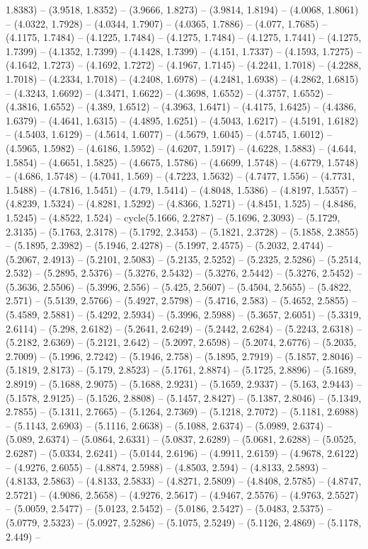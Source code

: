 1.8383) -- (3.9518, 1.8352) -- (3.9666, 1.8273) -- (3.9814, 1.8194) -- (4.0068, 1.8061) -- (4.0322, 1.7928) -- (4.0344, 1.7907) -- (4.0365, 1.7886) -- (4.077, 1.7685) -- (4.1175, 1.7484) -- (4.1225, 1.7484) -- (4.1275, 1.7484) -- (4.1275, 1.7441) -- (4.1275, 1.7399) -- (4.1352, 1.7399) -- (4.1428, 1.7399) -- (4.151, 1.7337) -- (4.1593, 1.7275) -- (4.1642, 1.7273) -- (4.1692, 1.7272) -- (4.1967, 1.7145) -- (4.2241, 1.7018) -- (4.2288, 1.7018) -- (4.2334, 1.7018) -- (4.2408, 1.6978) -- (4.2481, 1.6938) -- (4.2862, 1.6815) -- (4.3243, 1.6692) -- (4.3471, 1.6622) -- (4.3698, 1.6552) -- (4.3757, 1.6552) -- (4.3816, 1.6552) -- (4.389, 1.6512) -- (4.3963, 1.6471) -- (4.4175, 1.6425) -- (4.4386, 1.6379) -- (4.4641, 1.6315) -- (4.4895, 1.6251) -- (4.5043, 1.6217) -- (4.5191, 1.6182) -- (4.5403, 1.6129) -- (4.5614, 1.6077) -- (4.5679, 1.6045) -- (4.5745, 1.6012) -- (4.5965, 1.5982) -- (4.6186, 1.5952) -- (4.6207, 1.5917) -- (4.6228, 1.5883) -- (4.644, 1.5854) -- (4.6651, 1.5825) -- (4.6675, 1.5786) -- (4.6699, 1.5748) -- (4.6779, 1.5748) -- (4.686, 1.5748) -- (4.7041, 1.569) -- (4.7223, 1.5632) -- (4.7477, 1.556) -- (4.7731, 1.5488) -- (4.7816, 1.5451) -- (4.79, 1.5414) -- (4.8048, 1.5386) -- (4.8197, 1.5357) -- (4.8239, 1.5324) -- (4.8281, 1.5292) -- (4.8366, 1.5271) -- (4.8451, 1.525) -- (4.8486, 1.5245) -- (4.8522, 1.524) -- cycle(5.1666, 2.2787) -- (5.1696, 2.3093) -- (5.1729, 2.3135) -- (5.1763, 2.3178) -- (5.1792, 2.3453) -- (5.1821, 2.3728) -- (5.1858, 2.3855) -- (5.1895, 2.3982) -- (5.1946, 2.4278) -- (5.1997, 2.4575) -- (5.2032, 2.4744) -- (5.2067, 2.4913) -- (5.2101, 2.5083) -- (5.2135, 2.5252) -- (5.2325, 2.5286) -- (5.2514, 2.532) -- (5.2895, 2.5376) -- (5.3276, 2.5432) -- (5.3276, 2.5442) -- (5.3276, 2.5452) -- (5.3636, 2.5506) -- (5.3996, 2.556) -- (5.425, 2.5607) -- (5.4504, 2.5655) -- (5.4822, 2.571) -- (5.5139, 2.5766) -- (5.4927, 2.5798) -- (5.4716, 2.583) -- (5.4652, 2.5855) -- (5.4589, 2.5881) -- (5.4292, 2.5934) -- (5.3996, 2.5988) -- (5.3657, 2.6051) -- (5.3319, 2.6114) -- (5.298, 2.6182) -- (5.2641, 2.6249) -- (5.2442, 2.6284) -- (5.2243, 2.6318) -- (5.2182, 2.6369) -- (5.2121, 2.642) -- (5.2097, 2.6598) -- (5.2074, 2.6776) -- (5.2035, 2.7009) -- (5.1996, 2.7242) -- (5.1946, 2.758) -- (5.1895, 2.7919) -- (5.1857, 2.8046) -- (5.1819, 2.8173) -- (5.179, 2.8523) -- (5.1761, 2.8874) -- (5.1725, 2.8896) -- (5.1689, 2.8919) -- (5.1688, 2.9075) -- (5.1688, 2.9231) -- (5.1659, 2.9337) -- (5.163, 2.9443) -- (5.1578, 2.9125) -- (5.1526, 2.8808) -- (5.1457, 2.8427) -- (5.1387, 2.8046) -- (5.1349, 2.7855) -- (5.1311, 2.7665) -- (5.1264, 2.7369) -- (5.1218, 2.7072) -- (5.1181, 2.6988) -- (5.1143, 2.6903) -- (5.1116, 2.6638) -- (5.1088, 2.6374) -- (5.0989, 2.6374) -- (5.089, 2.6374) -- (5.0864, 2.6331) -- (5.0837, 2.6289) -- (5.0681, 2.6288) -- (5.0525, 2.6287) -- (5.0334, 2.6241) -- (5.0144, 2.6196) -- (4.9911, 2.6159) -- (4.9678, 2.6122) -- (4.9276, 2.6055) -- (4.8874, 2.5988) -- (4.8503, 2.594) -- (4.8133, 2.5893) -- (4.8133, 2.5863) -- (4.8133, 2.5833) -- (4.8271, 2.5809) -- (4.8408, 2.5785) -- (4.8747, 2.5721) -- (4.9086, 2.5658) -- (4.9276, 2.5617) -- (4.9467, 2.5576) -- (4.9763, 2.5527) -- (5.0059, 2.5477) -- (5.0123, 2.5452) -- (5.0186, 2.5427) -- (5.0483, 2.5375) -- (5.0779, 2.5323) -- (5.0927, 2.5286) -- (5.1075, 2.5249) -- (5.1126, 2.4869) -- (5.1178, 2.449) -- 